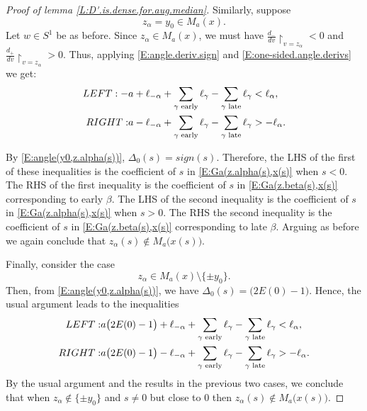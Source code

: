 \documentclass[10pt,a4paper]{amsart}
\begin{document}
\begin{proof}[Proof of lemma \ref{L:D'.is.dense.for.aug.median}]
Similarly, suppose 
    \begin{equation*}
       z_{\alpha} = y_{0} \in M_{a}(x) .
    \end{equation*} 
Let $w \in S^{1}$ be as before. Since $z_{\alpha} \in M_{a}(x)$, we must have $\tfrac{d_{-}}{dv} \restriction_{v=z_{\alpha}} < 0$ and 
$\tfrac{d_{+}}{dv} \restriction_{v=z_{\alpha}} > 0$. Thus, applying \eqref{E:angle.deriv.sign} and \eqref{E:one-sided.angle.derivs} we get:
    \begin{align*}
       \emph{LEFT: } -&a + \ell_{-\alpha} 
         + \sum_{\gamma \text{ early}} \ell_{\gamma} 
                  - \sum_{\gamma \text{ late}} \ell_{\gamma} < \ell_{\alpha} , \\
       \emph{RIGHT: }  &a - \ell_{-\alpha} 
         + \sum_{\gamma \text{ early}} \ell_{\gamma} 
                  - \sum_{\gamma \text{ late}} \ell_{\gamma} > - \ell_{\alpha} .
    \end{align*}

By \eqref{E:angle(y0,z.alpha(s))}, $\Delta_{0}(s)= sign(s)$. Therefore, the LHS of the first of these inequalities is the coefficient of $s$ in \eqref{E:Ga(z.alpha(s),x(s)} when $s < 0$. The RHS of the first inequality is the coefficient of $s$ in \eqref{E:Ga(z.beta(s),x(s)} corresponding to early $\beta$. 
The LHS of the second inequality is the coefficient of $s$ in \eqref{E:Ga(z.alpha(s),x(s)} when $s > 0$. The RHS the second inequality is the coefficient of $s$ in \eqref{E:Ga(z.beta(s),x(s)} corresponding to late $\beta$. Arguing as before we again conclude that 
$z_{\alpha}(s) \notin M_{a} \bigl( x(s) \bigr)$.

Finally, consider the case 
    \begin{equation*}
      z_{\alpha} \in M_{a}(x) \setminus \{ \pm y_{0} \} .
    \end{equation*} 
Then, from \eqref{E:angle(y0,z.alpha(s))}, we have 
$\Delta_{0}(s) = \bigl( 2 E(0) - 1 \bigr)$. Hence, the usual argument leads to the inequalities
    \begin{align*}
       \emph{LEFT: } &a \bigl( 2 E(0) - 1 \bigr) + \ell_{-\alpha} 
         + \sum_{\gamma \text{ early}} \ell_{\gamma} 
           - \sum_{\gamma \text{ late}} \ell_{\gamma} < \ell_{\alpha} , \\
       \emph{RIGHT: }  &a \bigl( 2 E(0) - 1 \bigr) - \ell_{-\alpha} 
          + \sum_{\gamma \text{ early}} \ell_{\gamma} 
            - \sum_{\gamma \text{ late}} \ell_{\gamma} > - \ell_{\alpha} .
    \end{align*}
By the usual argument and the results in the previous two cases, we conclude that when $z_{\alpha} \notin \{ \pm y_{0} \}$ and $s \neq 0$ but close to 0 then $z_{\alpha}(s) \notin M_{a} \bigl( x(s) \bigr)$. 
 

\end{proof}
\end{document}
